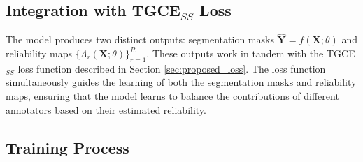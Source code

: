 \subsection{Integration with TGCE$_{SS}$ Loss}

The model produces two distinct outputs: segmentation masks
$\mathbf{\hat{Y}} = f(\mathbf{X};\theta)$ and reliability maps
$\{\Lambda_r(\mathbf{X};\theta)\}_{r=1}^R$. These outputs work in
tandem with the TGCE$_{SS}$ loss function described in Section
\ref{sec:proposed_loss}. The loss function simultaneously guides the
learning of both the segmentation masks and reliability maps,
ensuring that the model learns to balance the contributions of
different annotators based on their estimated reliability.

\subsection{Training Process}

